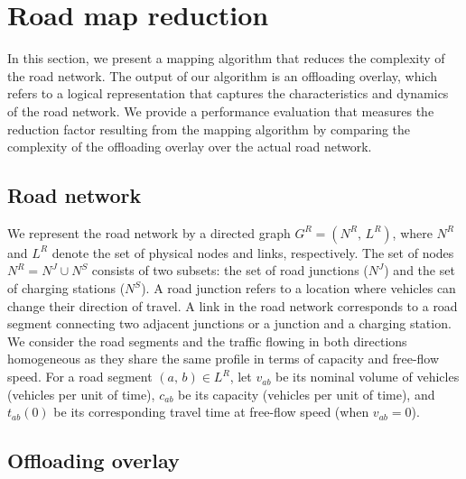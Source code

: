 \section{Road map reduction}
\label{sec:offloading-service-model}

In this section, we present a mapping algorithm that reduces the complexity of the road network. The output of our algorithm is an offloading overlay, which refers to a logical representation that captures the characteristics and dynamics of the road network. We provide a performance evaluation that measures the reduction factor resulting from the mapping algorithm by comparing the complexity of the offloading overlay over the actual road network.

\subsection{Road network}
\label{sec:road-network-characterization}

We represent the road network by a directed graph $G^R=(N^R,\,L^R)$, where $N^R$ and $L^R$ denote the set of physical nodes and links, respectively. The set of nodes $N^R=N^J\cup N^S$ consists of two subsets: the set of road junctions ($N^J$) and the set of charging stations ($N^S$). A road junction refers to a location where vehicles can change their direction of travel. A link in the road network corresponds to a road segment connecting two adjacent junctions or a junction and a charging station. We consider the road segments and the traffic flowing in both directions homogeneous as they share the same profile in terms of capacity and free-flow speed. For a road segment $(a,\,b)\in L^{R}$, let $v_{ab}$ be its nominal volume of vehicles (vehicles per unit of time), $c_{ab}$ be its capacity (vehicles per unit of time), and $t_{ab}(0)$ be its corresponding travel time at free-flow speed (\ie when $v_{ab}=0$). 

\subsection{Offloading overlay}
\label{sec:offloading-overlay-characterization}

